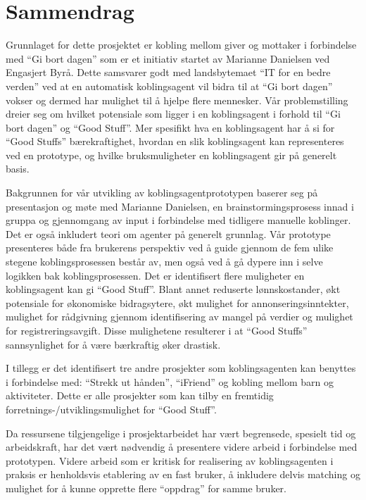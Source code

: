\section*{Sammendrag}
Grunnlaget for dette prosjektet er kobling mellom giver og mottaker i forbindelse med ``Gi bort dagen'' som er et initiativ startet av Marianne Danielsen ved Engasjert Byrå. Dette samsvarer godt med landsbytemaet ``IT for en bedre verden'' ved at en automatisk koblingsagent vil bidra til at ``Gi bort dagen'' vokser og dermed har mulighet til å hjelpe flere mennesker. Vår problemstilling dreier seg om hvilket potensiale som ligger i en koblingsagent i forhold til ``Gi bort dagen'' og ``Good Stuff''. Mer spesifikt hva en koblingsagent har å si for ``Good Stuffs'' bærekraftighet, hvordan en slik koblingsagent kan representeres ved en prototype, og hvilke bruksmuligheter en koblingsagent gir på generelt basis. 

Bakgrunnen for vår utvikling av koblingsagentprototypen baserer seg på presentasjon og møte med Marianne Danielsen, en brainstormingsprosess innad i gruppa og gjennomgang av input i forbindelse med tidligere manuelle koblinger. Det er også inkludert teori om agenter på generelt grunnlag. Vår prototype presenteres både fra brukerens perspektiv ved å guide gjennom de fem ulike stegene koblingsprosessen består av, men også ved å gå dypere inn i selve logikken bak koblingsprosessen. Det er identifisert flere muligheter en koblingsagent kan gi ``Good Stuff''. Blant annet reduserte lønnskostander, økt potensiale for økonomiske bidragsytere, økt mulighet for annonseringsinntekter, mulighet for rådgivning gjennom identifisering av mangel på verdier og mulighet for registreringsavgift. Disse mulighetene resulterer i at ``Good Stuffs'' sannsynlighet for å være bærkraftig øker drastisk. 

I tillegg er det identifisert tre andre prosjekter som koblingsagenten kan benyttes i forbindelse med: ``Strekk ut hånden'', ``iFriend'' og kobling mellom barn og aktiviteter. Dette er alle prosjekter som kan tilby en fremtidig forretnings-/utviklingsmulighet for ``Good Stuff''. 

Da ressursene tilgjengelige i prosjektarbeidet har vært begrensede, spesielt tid og arbeidskraft, har det vært nødvendig å presentere videre arbeid i forbindelse med prototypen. Videre arbeid som er kritisk for realisering av koblingsagenten i praksis er henholdsvis etablering av en fast bruker, å inkludere delvis matching og mulighet for å kunne opprette flere ``oppdrag'' for samme bruker. 
